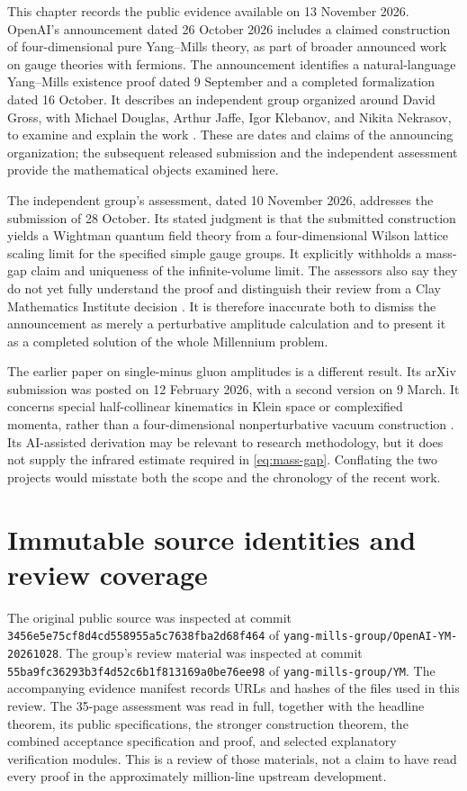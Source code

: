 This chapter records the public evidence available on 13 November 2026.
OpenAI's announcement dated 26 October 2026 includes a claimed construction
of four-dimensional pure Yang--Mills theory, as part of broader announced
work on gauge theories with fermions.  The announcement identifies a
natural-language Yang--Mills existence proof dated 9 September and a
completed formalization dated 16 October.  It describes an independent
group organized around David Gross, with Michael Douglas, Arthur Jaffe,
Igor Klebanov, and Nikita Nekrasov, to examine and explain the work
\cite{OpenAICommunity2026}.  These are dates and claims of the announcing
organization; the subsequent released submission and the independent
assessment provide the mathematical objects examined here.

The independent group's assessment, dated 10 November 2026, addresses the
submission of 28 October.  Its stated judgment is that the submitted
construction yields a Wightman quantum field theory from a four-dimensional
Wilson lattice scaling limit for the specified simple gauge groups.  It
explicitly withholds a mass-gap claim and uniqueness of the infinite-volume
limit.  The assessors also say they do not yet fully understand the proof
and distinguish their review from a Clay Mathematics Institute decision
\cite{YMReview2026}.  It is therefore inaccurate both to dismiss the
announcement as merely a perturbative amplitude calculation and to present
it as a completed solution of the whole Millennium problem.

The earlier paper on single-minus gluon amplitudes is a different result.
Its arXiv submission was posted on 12 February 2026, with a second version
on 9 March.  It concerns special half-collinear kinematics in Klein space
or complexified momenta, rather than a four-dimensional nonperturbative
vacuum construction \cite{Guevara2026}.  Its AI-assisted derivation may be
relevant to research methodology, but it does not supply the infrared
estimate required in \eqref{eq:mass-gap}.  Conflating the two projects would
misstate both the scope and the chronology of the recent work.

\section{Immutable source identities and review coverage}

The original public source was inspected at commit
\texttt{3456e5e75cf8d4cd558955a5c7638fba2d68f464} of
\texttt{yang-mills-group/OpenAI-YM-20261028}.  The group's review material
was inspected at commit
\texttt{55ba9fc36293b3f4d52c6b1f813169a0be76ee98} of
\texttt{yang-mills-group/YM}.  The accompanying evidence manifest records
URLs and hashes of the files used in this review.  The 35-page assessment
was read in full, together with the headline theorem, its public
specifications, the stronger construction theorem, the combined acceptance
specification and proof, and selected explanatory verification modules.
This is a review of those materials, not a claim to have read every proof
in the approximately million-line upstream development.

